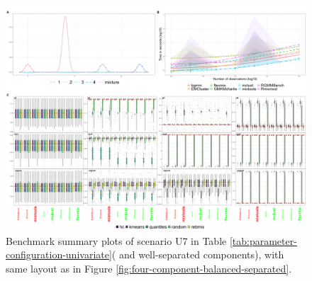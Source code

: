 \begin{figure}

{\centering \includegraphics[width=1\linewidth]{./figs/univariate/univariate_unbalanced_separated} 

}

\caption{Benchmark summary plots of scenario U7 in Table \ref{tab:parameter-configuration-univariate}( and well-separated components), with same layout as in Figure \ref{fig:four-component-balanced-separated}.}\label{fig:four-component-unbalanced-separated}
\end{figure}

\newpage

